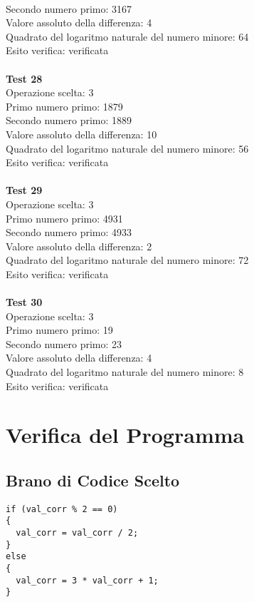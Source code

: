 \documentclass[10pt]{report}
\begin{document}
\\Secondo numero primo: 3167
\\Valore assoluto della differenza: 4
\\Quadrato del logaritmo naturale del numero minore: 64
\\Esito verifica: verificata
\\
\\\textbf{Test 28} 
\\Operazione scelta: 3
\\Primo numero primo: 1879
\\Secondo numero primo: 1889
\\Valore assoluto della differenza: 10
\\Quadrato del logaritmo naturale del numero minore: 56
\\Esito verifica: verificata
\\
\\\textbf{Test 29} 
\\Operazione scelta: 3
\\Primo numero primo: 4931
\\Secondo numero primo: 4933
\\Valore assoluto della differenza: 2
\\Quadrato del logaritmo naturale del numero minore: 72
\\Esito verifica: verificata
\\
\\\textbf{Test 30} 
\\Operazione scelta: 3
\\Primo numero primo: 19
\\Secondo numero primo: 23
\\Valore assoluto della differenza: 4
\\Quadrato del logaritmo naturale del numero minore: 8
\\Esito verifica: verificata

\newpage

\section{Verifica del Programma}
\subsection{Brano di Codice Scelto}
\begin{lstlisting}[label = {lst:verificaProgramma}]
if (val_corr % 2 == 0)
{  
  val_corr = val_corr / 2;
} 
else 
{   
  val_corr = 3 * val_corr + 1;
}
\end{lstlisting}
\end{document}
